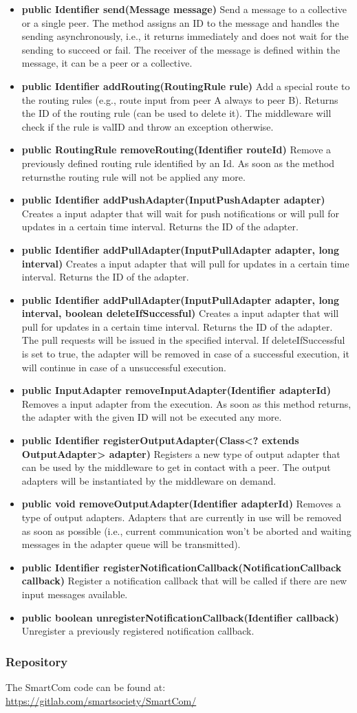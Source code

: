 \begin{itemize}
\item {\bf public Identifier send(Message message)} Send a message to a collective or a single peer. The method assigns an ID to the message and handles the sending asynchronously, i.e., it returns immediately and does not wait for the sending to succeed or fail. The receiver of the message is defined within the message, it can be a peer or a collective.
\item {\bf public Identifier addRouting(RoutingRule rule)} Add a special route to the routing rules (e.g., route input from peer A always to peer B). Returns the ID of the routing rule (can be used to delete it). The middleware will check if the rule is valID and throw an exception otherwise.
\item {\bf public RoutingRule removeRouting(Identifier routeId)} Remove a previously defined routing rule identified by an Id. As soon as the method returnsthe routing rule will not be applied any more. 
\item {\bf public Identifier addPushAdapter(InputPushAdapter adapter)} Creates a input adapter that will wait for push notifications or will pull for updates in a certain time interval. Returns the ID of the adapter.
 \item {\bf public Identifier addPullAdapter(InputPullAdapter adapter, long interval)} Creates a input adapter that will pull for updates in a certain time interval. Returns the ID of the adapter. 
 \item {\bf public Identifier addPullAdapter(InputPullAdapter adapter, long interval, boolean deleteIfSuccessful)} Creates a input adapter that will pull for updates in a certain time interval. Returns the ID of the adapter. The pull requests will be issued in the specified interval. If deleteIfSuccessful is set to true, the adapter will be removed in case of a successful execution, it will continue in case of a unsuccessful execution.
\item {\bf public InputAdapter removeInputAdapter(Identifier adapterId)}  Removes a input adapter from the execution. As soon as this method returns, the  adapter with the given ID will not be executed any more. 
\item {\bf public Identifier registerOutputAdapter(Class<? extends OutputAdapter> adapter)} Registers a new type of output adapter that can be used by the middleware to get in contact with a peer. The output adapters will be instantiated by the middleware on demand. 
\item {\bf public void removeOutputAdapter(Identifier adapterId)} Removes a type of output adapters. Adapters that are currently in use will be removed as soon as possible (i.e., current communication won’t be aborted and waiting messages in the adapter queue will be transmitted).
\item {\bf public Identifier registerNotificationCallback(NotificationCallback callback)} Register a notification callback that will be called if there are new input messages available.
\item {\bf public boolean unregisterNotificationCallback(Identifier callback)} Unregister a previously registered notification callback.
\end{itemize}  
\subsubsection{Repository}
The SmartCom code can be found at: \url{https://gitlab.com/smartsociety/SmartCom/}

